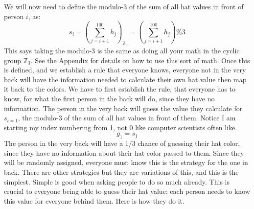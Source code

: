 \documentclass[10pt]{article}
\begin{document}
We will now need to define the 
modulo-3 of the sum of all hat values 
in front of person $i$, as:
\begin{equation*}
    s_i = \left(\sum_{j=i+1}^{100} h_j\right)_{\mathbb{Z}_3}
        = \left(\sum_{j=i+1}^{100} h_j\right) \% 3
\end{equation*}
This says taking the modulo-3 is the same as doing all your math in the 
cyclic group $\mathbb{Z}_3$. See the Appendix for details on 
how to use this sort of math. 
Once this is defined, and we establish a rule that everyone knows, 
everyone not in the very back will have the information needed to 
calculate their own hat value then map it back to the colors. 
We have 
to first establish the rule, that everyone has to know, for what the first 
person in the back will do, since they have no information. 
The person in the very back will guess the value they calculate for $s_{i=1}$, 
the modulo-3 of the sum of all hat values in front of them. Notice I am starting 
my index numbering from 1, not 0 like computer scientists often like.
\begin{equation*}
    g_1 = s_1
\end{equation*}
The person in the very back will have a $1/3$ chance of guessing their 
hat color, since they have no information about their hat color passed to 
them. Since they will be randomly assigned, everyone must know 
this is the strategy for the one in back. There are other 
strategies but they are variations of this, and this is the simplest. Simple 
is good when asking people to do so much already.
This is crucial to everyone being able to guess their hat value: each person
needs to know this value for everyone behind them. Here is how they do it.
\end{document}
